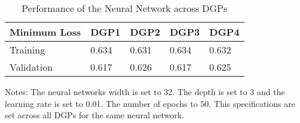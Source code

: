 

\begin{table}[]
\centering
\begin{threeparttable}
\caption{Performance of the Neural Network across DGPs}
\label{tab:table3}
\begin{tabular}{@{}lllll@{}}
\toprule
\addlinespace
Minimum Loss                & DGP1 & DGP2 & DGP3 & DGP4 \\ \midrule
Training    & 0.634 & 0.631 & 0.634 & 0.632 \\
Validation  & 0.617 & 0.626 & 0.617 & 0.625 \\ \bottomrule
\end{tabular}
\begin{tablenotes}
    \item Notes: The neural networks width is set to 32. The depth is set to 3 and the learning rate is set to 0.01. The number of epochs to 50. This specifications are set across all DGPs for the same neural network.
\end{tablenotes}
\end{threeparttable}
\end{table}
